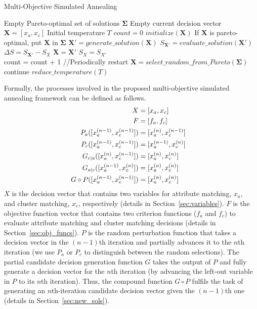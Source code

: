 \begin{algorithm}
\caption{Multi-Objective Simulated Annealing}
\label{MOSA}
\begin{algorithmic}
\REQUIRE Empty Pareto-optimal set of solutions $\mathbf{\Sigma}$
\REQUIRE Empty current decision vector $\mathbf{X}=[x_a,x_c]$
\REQUIRE Initial temperature $T$
\STATE $count=0$
\STATE $initialize(\mathbf{X})$ \hspace{1in} %
\STATE If $\mathbf{X}$ is pareto-optimal, put $\mathbf{X}$ in $\mathbf{\Sigma}$
\STATE $\mathbf{X}'=generate\_solution(\mathbf{X})$
\STATE $S_{\mathbf{X}'}=evaluate\_solution(\mathbf{X}')$
\STATE $\Delta S = S_{\mathbf{X}'} - S_X$
\STATE $\mathbf{X}=\mathbf{X}'$
\STATE $S_X=S_{X'}$
\ENDIF\\
\STATE count = count + 1
\STATE //Periodically restart
\STATE $\mathbf{X}=select\_random\_from\_Pareto(\mathbf{\Sigma})$
\STATE continue
\ENDIF
\STATE $reduce\_temperature(T)$
\ENDWHILE
\end{algorithmic}
\end{algorithm}

Formally, the processes involved in the proposed multi-objective simulated annealing framework can be defined as follows.
\begin{align}
\notag X&=[x_a, x_c]\\
\notag F&=[f_a, f_c]\\
\notag P_a([x_a^{(n-1)},x_c^{(n-1)}])&=[x_a^{(n)}, x_c^{(n-1)}]\\
\notag P_c([x_a^{(n-1)},x_c^{(n-1)}])&=[x_a^{(n-1)}, x_c^{(n)}]\\
\notag G_{c|a}([x_a^{(n)},x_c^{(n-1)}])&=[x_a^{(n)}, x_c^{(n)}]\\
\notag G_{a|c}([x_a^{(n-1)},x_c^{(n)}])&=[x_a^{(n)}, x_c^{(n)}]\\
\notag G\circ P([x_a^{(n-1)},x_c^{(n-1)}])&=[x_a^{(n)}, x_c^{(n)}]
\end{align}
$X$ is the decision vector that contains two variables for attribute matching, $x_a$, and cluster matching, $x_c$, respectively (details in Section~\ref{sec:variables}). $F$ is the objective function vector that contains two criterion functions ($f_a$ and $f_c$) to evaluate attribute matching and cluster matching decisions (details in Section~\ref{sec:obj_funcs}). $P$ is the random perturbation function that takes a decision vector in the $(n-1)$th iteration and partially advances it to the $n$th iteration (we use $P_a$ or $P_c$ to distinguish between the random selections). The partial candidate decision generation function $G$ takes the output of $P$ and fully generate a decision vector for the $n$th iteration (by advancing the left-out variable in $P$ to its $n$th iteration). Thus, the compound function $G\circ P$ fulfils the task of generating an $n$th-iteration candidate decision vector given the $(n-1)$th one (details in Section~\ref{sec:new_sols}).

